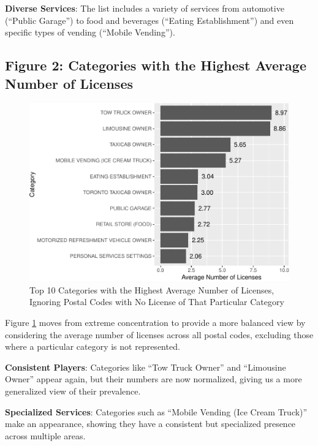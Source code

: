 \documentclass[
]{article}
\begin{document}
\textbf{Diverse Services}: The list includes a variety of services from automotive (``Public Garage'') to food and beverages (``Eating Establishment'') and even specific types of vending (``Mobile Vending'').

\newpage

\hypertarget{figure-2-categories-with-the-highest-average-number-of-licenses}{%
\subsection{Figure 2: Categories with the Highest Average Number of Licenses}\label{figure-2-categories-with-the-highest-average-number-of-licenses}}

\begin{figure}
\centering
\includegraphics{paper_files/figure-latex/average-1.pdf}
\caption{\label{fig:average}Top 10 Categories with the Highest Average Number of Licenses,
Ignoring Postal Codes with No License of That Particular Category}
\end{figure}

Figure \ref{fig:average} moves from extreme concentration to provide a more balanced view by considering the average number of licenses across all postal codes, excluding those where a particular category is not represented.

\textbf{Consistent Players}: Categories like ``Tow Truck Owner'' and ``Limousine Owner'' appear again, but their numbers are now normalized, giving us a more generalized view of their prevalence.

\textbf{Specialized Services}: Categories such as ``Mobile Vending (Ice Cream Truck)'' make an appearance, showing they have a consistent but specialized presence across multiple areas.
\end{document}
